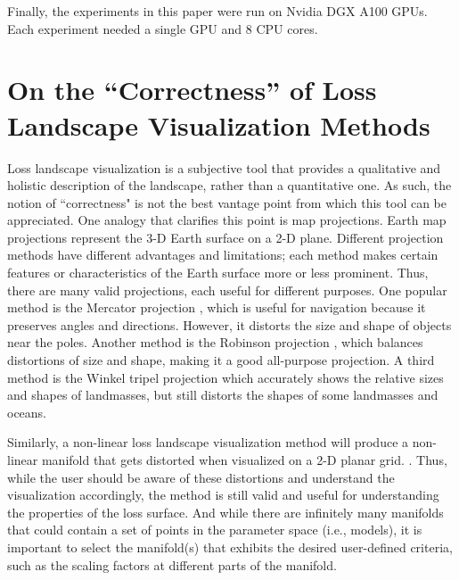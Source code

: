 \documentclass[letterpaper]{article} %
\begin{document}
            Finally, the experiments in this paper were run on Nvidia DGX A100 GPUs. Each experiment needed a single GPU and 8 CPU cores.

  \section{On the ``Correctness” of Loss Landscape Visualization Methods} \label{app:correctness}
            
           Loss landscape visualization is a subjective tool that provides a qualitative and holistic description of the landscape, rather than a quantitative one. As such, the notion of ``correctness" is not the best vantage point from which this tool can be appreciated. One analogy that clarifies this point is map projections. Earth map projections represent the 3-D Earth surface on a 2-D plane. Different projection methods have different advantages and limitations; each method makes certain features or characteristics of the Earth surface more or less prominent. Thus, there are many valid projections, each useful for different purposes. One popular method is the Mercator projection \cite{snyder1997flattening}, which is useful for navigation because it preserves angles and directions. However, it distorts the size and shape of objects near the poles. Another method is the Robinson projection \cite{snyder1990robinson}, which balances distortions of size and shape, making it a good all-purpose projection. 
           A third method is the Winkel tripel projection \cite{snyder1997flattening} which 
           accurately shows the relative sizes and shapes of landmasses, but still distorts the shapes of some landmasses and oceans. 
           
           Similarly, a non-linear loss landscape visualization method will produce a non-linear manifold that gets distorted when visualized on a 2-D planar grid. . Thus, while the user should be aware of these distortions and understand the visualization accordingly, the method is still valid and useful for understanding the properties of the loss surface. And while there are infinitely many manifolds that could contain a set of points in the parameter space (i.e., models), it is important to select the manifold(s) that exhibits the desired user-defined criteria, such as the scaling factors at different parts of the manifold.
\end{document}
